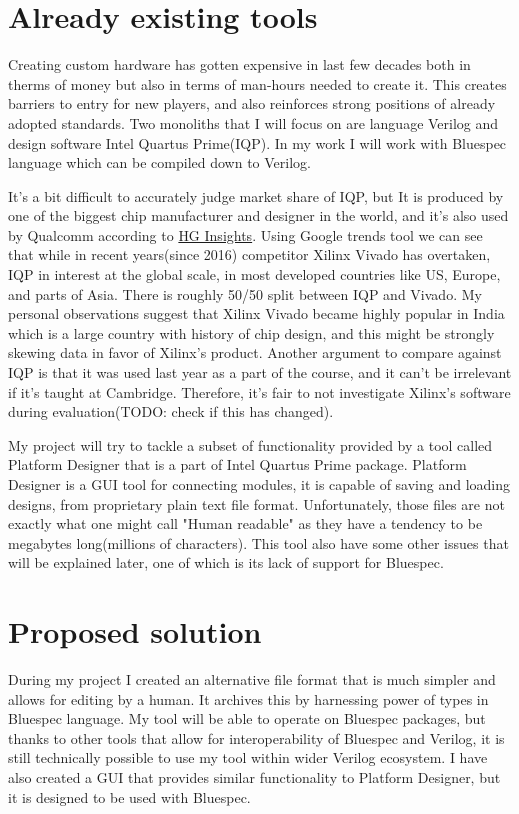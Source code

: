 \documentclass[14pt]{report}
\begin{document}
\section{Already existing tools}
Creating custom hardware has gotten expensive in last few decades both in therms of money but also in terms of man-hours needed to create it. 
This creates barriers to entry for new players, and also reinforces strong positions of already adopted standards. 
Two monoliths that I will focus on are language Verilog and design software Intel Quartus Prime(IQP). 
In my work I will work with Bluespec language which can be compiled down to Verilog. 
\begin{tcolorbox}[title=Market share and justification for focusing entirely on comparisons with Intel Quartus Prime]
    It's a bit difficult to accurately judge market share of IQP, but It is produced by one of the biggest chip manufacturer and designer in the world, and it's also used by Qualcomm according to \href{https://discovery.hgdata.com/product/intel-quartus-prime}{HG Insights}. Using Google trends tool we can see that while in recent years(since 2016) competitor Xilinx Vivado has overtaken, IQP in interest at the global scale, in most developed countries like US, Europe, and parts of Asia. There is roughly 50/50 split between IQP and Vivado. My personal observations suggest that Xilinx Vivado became highly popular in India which is a large country with history of chip design, and this might be strongly skewing data in favor of Xilinx's product. Another argument to compare against IQP is that it was used last year as a part of the course, and it can't be irrelevant if it's taught at Cambridge. Therefore, it's fair to not investigate Xilinx's software during evaluation(TODO: check if this has changed).
\end{tcolorbox}
My project will try to tackle a subset of functionality provided by a tool called Platform Designer that is a part of Intel Quartus Prime package. Platform Designer is a GUI tool for connecting modules, it is capable of saving and loading designs, from proprietary plain text file format. Unfortunately, those files are not exactly what one might call "Human readable" as they have a tendency to be megabytes long(millions of characters). This tool also have some other issues that will be explained later, one of which is its lack of support for Bluespec.

\section{Proposed solution}
During my project I created an alternative file format that is much simpler and allows for editing by a human. It archives this by harnessing power of types in Bluespec language. My tool will be able to operate on Bluespec packages, but thanks to other tools that allow for interoperability of Bluespec and Verilog, it is still technically possible to use my tool within wider Verilog ecosystem. I have also created a GUI that provides similar functionality to Platform Designer, but it is designed to be used with Bluespec.
\end{document}
